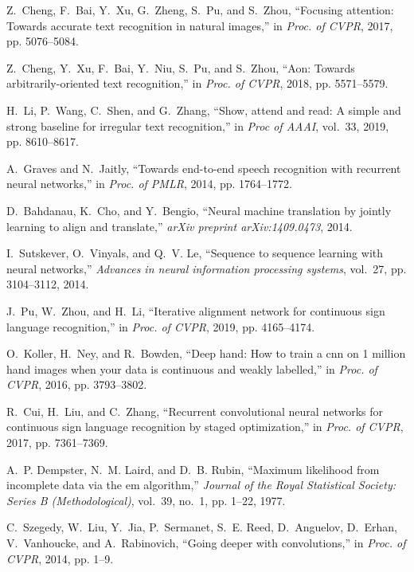 \documentclass[journal]{IEEEtran}
\begin{document}
\begin{thebibliography}{10}
	Z.~Cheng, F.~Bai, Y.~Xu, G.~Zheng, S.~Pu, and S.~Zhou, ``Focusing attention:
	Towards accurate text recognition in natural images,'' in \emph{Proc. of
		CVPR}, 2017, pp. 5076--5084.
	
	Z.~Cheng, Y.~Xu, F.~Bai, Y.~Niu, S.~Pu, and S.~Zhou, ``Aon: Towards
	arbitrarily-oriented text recognition,'' in \emph{Proc. of CVPR}, 2018, pp.
	5571--5579.
	
	H.~Li, P.~Wang, C.~Shen, and G.~Zhang, ``Show, attend and read: A simple and
	strong baseline for irregular text recognition,'' in \emph{Proc of AAAI},
	vol.~33, 2019, pp. 8610--8617.
	
	A.~Graves and N.~Jaitly, ``Towards end-to-end speech recognition with recurrent
	neural networks,'' in \emph{Proc. of PMLR}, 2014, pp. 1764--1772.
	
	D.~Bahdanau, K.~Cho, and Y.~Bengio, ``Neural machine translation by jointly
	learning to align and translate,'' \emph{arXiv preprint arXiv:1409.0473},
	2014.
	
	I.~Sutskever, O.~Vinyals, and Q.~V. Le, ``Sequence to sequence learning with
	neural networks,'' \emph{Advances in neural information processing systems},
	vol.~27, pp. 3104--3112, 2014.
	
	J.~Pu, W.~Zhou, and H.~Li, ``Iterative alignment network for continuous sign
	language recognition,'' in \emph{Proc. of CVPR}, 2019, pp. 4165--4174.
	
	O.~Koller, H.~Ney, and R.~Bowden, ``Deep hand: How to train a cnn on 1 million
	hand images when your data is continuous and weakly labelled,'' in
	\emph{Proc. of CVPR}, 2016, pp. 3793--3802.
	
	R.~Cui, H.~Liu, and C.~Zhang, ``Recurrent convolutional neural networks for
	continuous sign language recognition by staged optimization,'' in \emph{Proc.
		of CVPR}, 2017, pp. 7361--7369.
	
	A.~P. Dempster, N.~M. Laird, and D.~B. Rubin, ``Maximum likelihood from
	incomplete data via the em algorithm,'' \emph{Journal of the Royal
		Statistical Society: Series B (Methodological)}, vol.~39, no.~1, pp. 1--22,
	1977.
	
	C.~Szegedy, W.~Liu, Y.~Jia, P.~Sermanet, S.~E. Reed, D.~Anguelov, D.~Erhan,
	V.~Vanhoucke, and A.~Rabinovich, ``Going deeper with convolutions,'' in
	\emph{Proc. of CVPR}, 2014, pp. 1--9.
	

\end{thebibliography}
\end{document}
